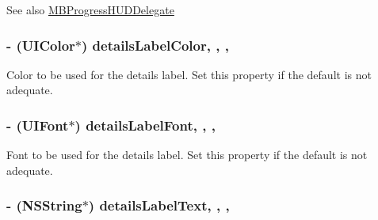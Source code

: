 \begin{DoxySeeAlso}{See also}
\hyperlink{protocol_m_b_progress_h_u_d_delegate-p}{M\+B\+Progress\+H\+U\+D\+Delegate} 
\end{DoxySeeAlso}
\hypertarget{interface_m_b_progress_h_u_d_ace929217bd7673159f063d5b8e80b080}{
\subsubsection[{details\+Label\+Color}]{\setlength{\rightskip}{0pt plus 5cm}-\/ (U\+I\+Color$\ast$) details\+Label\+Color\hspace{0.3cm}{\ttfamily [read]}, {\ttfamily [write]}, {\ttfamily [atomic]}, {\ttfamily [assign]}}}\label{interface_m_b_progress_h_u_d_ace929217bd7673159f063d5b8e80b080}
Color to be used for the details label. Set this property if the default is not adequate. \hypertarget{interface_m_b_progress_h_u_d_af070a363d323d8eb0285e38d398b51c2}{
\subsubsection[{details\+Label\+Font}]{\setlength{\rightskip}{0pt plus 5cm}-\/ (U\+I\+Font$\ast$) details\+Label\+Font\hspace{0.3cm}{\ttfamily [read]}, {\ttfamily [write]}, {\ttfamily [atomic]}, {\ttfamily [assign]}}}\label{interface_m_b_progress_h_u_d_af070a363d323d8eb0285e38d398b51c2}
Font to be used for the details label. Set this property if the default is not adequate. \hypertarget{interface_m_b_progress_h_u_d_a8b7cbf551fc551c64159b7a3f648c6ac}{
\subsubsection[{details\+Label\+Text}]{\setlength{\rightskip}{0pt plus 5cm}-\/ (N\+S\+String$\ast$) details\+Label\+Text\hspace{0.3cm}{\ttfamily [read]}, {\ttfamily [write]}, {\ttfamily [atomic]}, {\ttfamily [copy]}}}\label{interface_m_b_progress_h_u_d_a8b7cbf551fc551c64159b7a3f648c6ac}

